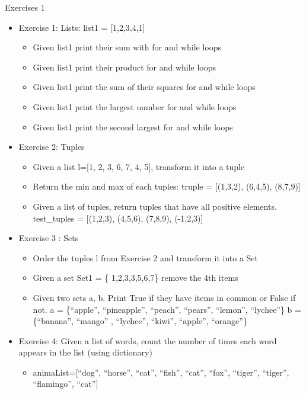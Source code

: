 \documentclass[
  8pt,
  ignorenonframetext,
]{beamer}
\providecommand{\tightlist}{%
  \setlength{\itemsep}{0pt}\setlength{\parskip}{0pt}}
\begin{document}
\begin{frame}{Exercises 1}
\protect\hypertarget{exercises-1}{}
\begin{itemize}
\tightlist
\item
  Exercise 1: Lists: list1 = {[}1,2,3,4,1{]}

  \begin{itemize}
  \tightlist
  \item
    Given list1 print their sum with for and while loops
  \item
    Given list1 print their product for and while loops
  \item
    Given list1 print the sum of their squares for and while loops
  \item
    Given list1 print the largest number for and while loops
  \item
    Given list1 print the second largest for and while loops
  \end{itemize}
\item
  Exercise 2: Tuples

  \begin{itemize}
  \tightlist
  \item
    Given a list l={[}1, 2, 3, 6, 7, 4, 5{]}, transform it into a tuple
  \item
    Return the min and max of each tuples: truple = {[}(1,3,2), (6,4,5),
    (8,7,9){]}
  \item
    Given a list of tuples, return tuples that have all positive
    elements. test\_tuples = {[}(1,2,3), (4,5,6), (7,8,9), (-1,2,3){]}
  \end{itemize}
\item
  Exercise 3 : Sets

  \begin{itemize}
  \tightlist
  \item
    Order the tuples l from Exercise 2 and transform it into a Set
  \item
    Given a set Set1 = \{ 1,2,3,3,5,6,7\} remove the 4th items
  \item
    Given two sets a, b. Print True if they have items in common or
    False if not. a = \{``apple'', ``pineapple'', ``peach'', ``pears'',
    ``lemon'', ``lychee''\} b = \{``banana'', ``mango'' , ``lychee'',
    ``kiwi'', ``apple'', ``orange''\}
  \end{itemize}
\item
  Exercise 4: Given a list of words, count the number of times each word
  appears in the list (using dictionary)

  \begin{itemize}
  \tightlist
  \item
    animaList={[}``dog'', ``horse'', ``cat'', ``fish'', ``cat'',
    ``fox'', ``tiger'', ``tiger'', ``flamingo'', ``cat''{]}
  \end{itemize}
\end{itemize}
\end{frame}
\end{document}
